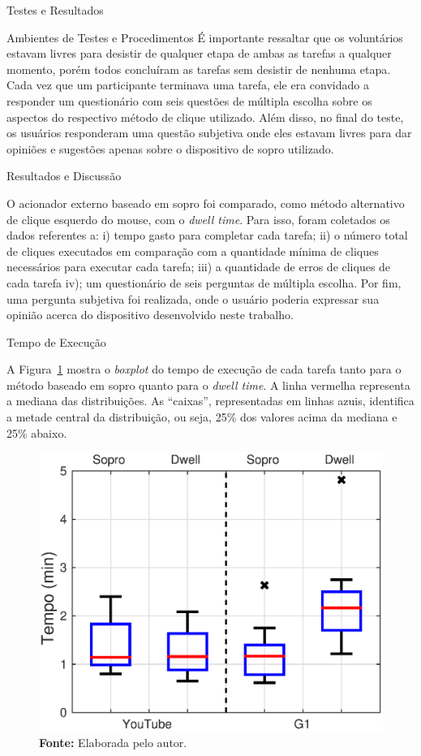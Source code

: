 \begin{chapter}{Testes e Resultados}
\begin{section}{Ambientes de Testes e Procedimentos}
É importante ressaltar que os voluntários estavam livres para desistir de
qualquer etapa de ambas as tarefas a qualquer momento, porém todos concluíram as
tarefas sem desistir de nenhuma etapa. Cada vez que um participante terminava
uma tarefa, ele era convidado a responder um questionário com seis questões de
múltipla escolha sobre os aspectos do respectivo método de clique utilizado.
Além disso, no final do teste, os usuários responderam uma questão subjetiva
onde eles estavam livres para dar opiniões e sugestões apenas sobre o dispositivo
de sopro utilizado.
\end{section}

\begin{section}{Resultados e Discussão}

O acionador externo baseado em sopro foi comparado, como
método alternativo de clique esquerdo do mouse, com o \textit{dwell time}. Para
isso, foram coletados os dados referentes a: i) tempo gasto para completar cada
tarefa; ii) o número total de cliques executados em comparação com a quantidade
mínima de cliques necessários para executar cada tarefa; iii) a quantidade de
erros de cliques de cada tarefa iv); um questionário de seis perguntas de
múltipla escolha. Por fim, uma pergunta subjetiva foi realizada, onde o usuário
poderia expressar sua opinião acerca do dispositivo desenvolvido neste trabalho.

\begin{subsection}{Tempo de Execução}

A Figura~\ref{fig:tempo} mostra o \textit{boxplot} do tempo de execução de cada
tarefa tanto para o método baseado em sopro quanto para o \textit{dwell time}. A
linha vermelha representa a mediana das distribuições. As ``caixas'',
representadas em linhas azuis, identifica a metade central da distribuição, ou
seja, 25\% dos valores acima da mediana e 25\% abaixo.

\begin{figure}[!h]
	\centering
	\includegraphics[width=.65\linewidth]{fig/time}
	\vspace{-0.5cm}
	\caption{Distribuição do tempo de conclusão das tarefas.}
	\vspace{-1cm}
	\caption*{\textbf{Fonte: }Elaborada pelo autor.}
	\label{fig:tempo}
\end{figure}


\end{subsection}
\end{section}
\end{chapter}
